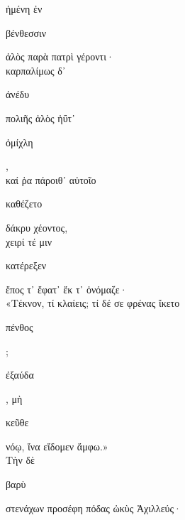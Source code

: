 \documentclass{ransom}
\begin{document}
\begin{foreignpage}
\begin{graytext}
ἡμένη ἐν \begin{whitetext}βένθεσσιν\end{whitetext} ἁλὸς παρὰ πατρὶ γέροντι·\\
καρπαλίμως δ᾽ \begin{whitetext}ἀνέδυ\end{whitetext} πολιῆς ἁλὸς ἠΰτ᾽ \begin{whitetext}ὀμίχλη\end{whitetext},\\
καί ῥα πάροιθ᾽ αὐτοῖο \begin{whitetext}καθέζετο\end{whitetext} δάκρυ χέοντος,\hfill{}\\
χειρί τέ μιν \begin{whitetext}κατέρεξεν\end{whitetext} ἔπος τ᾽ ἔφατ᾽ ἔκ τ᾽ ὀνόμαζε·\\
«Τέκνον, τί κλαίεις; τί δέ σε φρένας ἵκετο \begin{whitetext}πένθος\end{whitetext};\\
\begin{whitetext}ἐξαύδα\end{whitetext}, μὴ \begin{whitetext}κεῦθε\end{whitetext} νόῳ, ἵνα εἴδομεν ἄμφω.»\\
Τὴν δὲ \begin{whitetext}βαρὺ\end{whitetext} στενάχων προσέφη πόδας ὠκὺς Ἀχιλλεύς·\\

\end{graytext}


\end{foreignpage}
\end{document}
